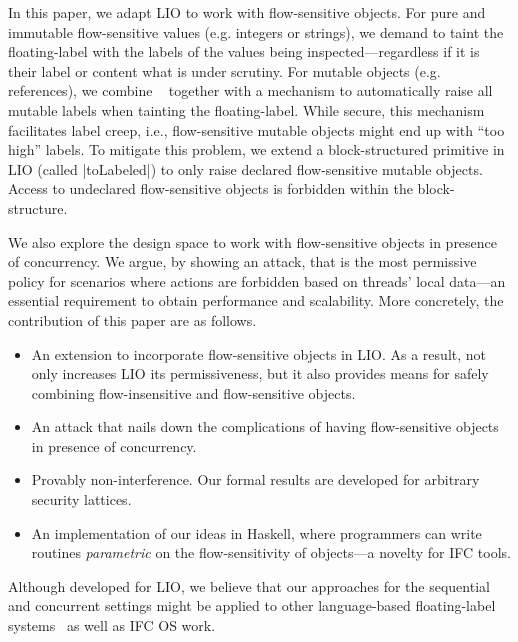 In this paper, we adapt LIO to work with flow-sensitive objects.  For pure and
immutable flow-sensitive values (e.g. integers or strings), we demand to taint
the floating-label with the labels of the values being inspected---regardless if
it is their label or content what is under scrutiny.  For mutable objects
(e.g. references), we combine \nsu~\citep{Austin:Flanagan:PLAS10} together with
a mechanism to automatically raise all mutable labels when tainting the
floating-label. While secure, this mechanism facilitates label creep, i.e.,
flow-sensitive mutable objects might end up with ``too high'' labels. To
mitigate this problem, we extend a block-structured primitive in LIO (called
|toLabeled|) to only raise declared flow-sensitive mutable objects. Access to
undeclared flow-sensitive objects is forbidden within the block-structure.


We also explore the design space to work with flow-sensitive objects in presence
of concurrency.
We argue, by showing an attack, that {\nsu} is the most
permissive policy for scenarios where actions are forbidden based on threads'
local data---an essential requirement to obtain performance and
scalability. More
concretely, the contribution of this paper are as follows.
\begin{itemize}

\item An extension to incorporate flow-sensitive objects in LIO. As a result,
  not only increases LIO its permissiveness, but it also provides means for safely
  combining flow-insensitive and flow-sensitive objects.

\item An attack that nails down the complications of having flow-sensitive
  objects in presence of concurrency.

\item Provably non-interference. Our formal results are developed for arbitrary
  security lattices. 

\item An implementation of our ideas in Haskell, where programmers can write
  routines \emph{parametric} on the flow-sensitivity of objects---a novelty for IFC
  tools. 
\end{itemize}

Although developed for LIO, we believe that our approaches for the sequential
and concurrent settings might be applied to other language-based floating-label
systems~\citep[e.g.][]{10.1109/SP.2013.10} as well as IFC OS work.

